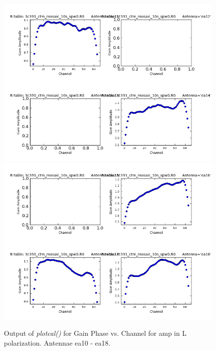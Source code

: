 \documentclass[12pt, a4paper]{article}
\begin{document}
\begin{figure}[h!]
\centering
\includegraphics[scale=0.65]{../Imaging/plots2/part4-subE-question3a_amp_pol-L-ea10-ea14.png}
\includegraphics[scale=0.65]{../Imaging/plots2/part4-subE-question3a_amp_pol-L-ea15-ea18.png}
\caption{Output of \emph{plotcal()} for Gain Phase vs. Channel for amp in L polarization. Antennae ea10 - ea18.}
\end{figure}
\addtocounter{figure}{-1}
\end{document}
